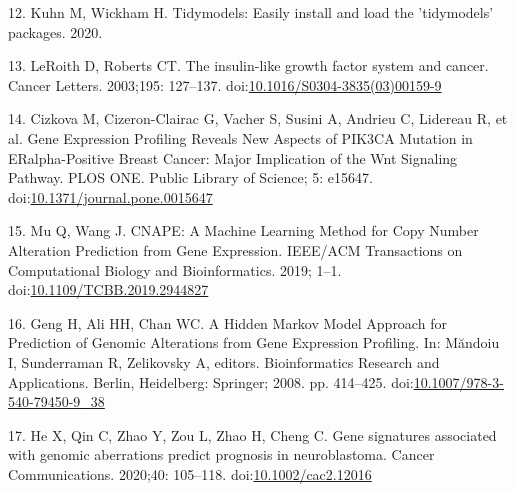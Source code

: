\documentclass[10pt,letterpaper]{article}
\begin{document}
\leavevmode\hypertarget{ref-kuhnTidymodelsEasilyInstall2020}{}%
12. Kuhn M, Wickham H. Tidymodels: Easily install and load the
'tidymodels' packages. 2020.

\leavevmode\hypertarget{ref-leroithInsulinlikeGrowthFactor2003}{}%
13. LeRoith D, Roberts CT. The insulin-like growth factor system and
cancer. Cancer Letters. 2003;195: 127--137.
doi:\href{https://doi.org/10.1016/S0304-3835(03)00159-9}{10.1016/S0304-3835(03)00159-9}

\leavevmode\hypertarget{ref-cizkovaGeneExpressionProfiling2010}{}%
14. Cizkova M, Cizeron-Clairac G, Vacher S, Susini A, Andrieu C,
Lidereau R, et al. Gene Expression Profiling Reveals New Aspects of
PIK3CA Mutation in ERalpha-Positive Breast Cancer: Major Implication of
the Wnt Signaling Pathway. PLOS ONE. Public Library of Science; 5:
e15647.
doi:\href{https://doi.org/10.1371/journal.pone.0015647}{10.1371/journal.pone.0015647}

\leavevmode\hypertarget{ref-muCNAPEMachineLearning2019}{}%
15. Mu Q, Wang J. CNAPE: A Machine Learning Method for Copy Number
Alteration Prediction from Gene Expression. IEEE/ACM Transactions on
Computational Biology and Bioinformatics. 2019; 1--1.
doi:\href{https://doi.org/10.1109/TCBB.2019.2944827}{10.1109/TCBB.2019.2944827}

\leavevmode\hypertarget{ref-gengHiddenMarkovModel2008}{}%
16. Geng H, Ali HH, Chan WC. A Hidden Markov Model Approach for
Prediction of Genomic Alterations from Gene Expression Profiling. In:
Măndoiu I, Sunderraman R, Zelikovsky A, editors. Bioinformatics Research
and Applications. Berlin, Heidelberg: Springer; 2008. pp. 414--425.
doi:\href{https://doi.org/10.1007/978-3-540-79450-9_38}{10.1007/978-3-540-79450-9\_38}

\leavevmode\hypertarget{ref-heGeneSignaturesAssociated2020}{}%
17. He X, Qin C, Zhao Y, Zou L, Zhao H, Cheng C. Gene signatures
associated with genomic aberrations predict prognosis in neuroblastoma.
Cancer Communications. 2020;40: 105--118.
doi:\href{https://doi.org/10.1002/cac2.12016}{10.1002/cac2.12016}

\nolinenumbers
\end{document}
